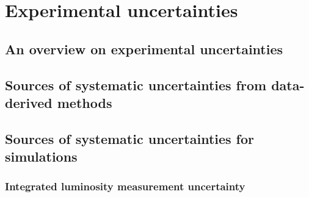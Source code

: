 \chapter{Experimental uncertainties}
\label{chap:ExperimentalUncertainties}


\section{An overview on experimental uncertainties}


\section{Sources of systematic uncertainties from data-derived methods}


\section{Sources of systematic uncertainties for simulations}
\label{sec:SimulationUncertainties}


\subsection*{Integrated luminosity measurement uncertainty}

